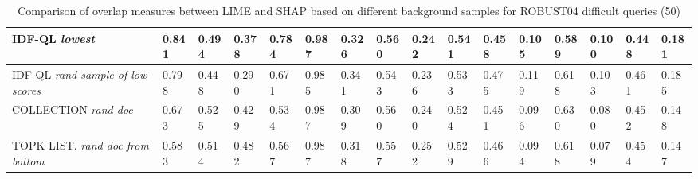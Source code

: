 \begin{table}
{\begin{tabular}{ |m{6em}|m{2em}|m{2em}|m{2em}|m{2em}|m{2.8em}||m{2em}|m{2em}|m{2em}|m{2em}|m{2.8em}||m{2em}|m{2em}|m{2em}|m{2em}|m{2.8em}|| }
 IDF-QL \newline \textit{lowest} & 0.841 & 0.494 & 0.378 & 0.784 & 0.987 & 0.326 & 0.560 & 0.242 & 0.541 & 0.458 & 0.105 & 0.589 & 0.100 & 0.448 & 0.181\\ 
 \hline
 
 IDF-QL \newline \textit{rand sample of low scores} & 0.798 & 0.448 & 0.290 & 0.671 & 0.985 & 0.341 & 0.543 & 0.236 & 0.533 & 0.475 & 0.119 & 0.618 & 0.103 & 0.461 & 0.185\\ 
 \hline
 
 COLLECTION \newline \textit{rand doc} & 0.673 & 0.525 & 0.429 & 0.534 & 0.987 & 0.309 & 0.560 & 0.240 & 0.524 & 0.451 & 0.096 & 0.630 & 0.080 & 0.452 & 0.148\\ 
 \hline
 
 TOPK LIST. \newline \textit{rand doc from bottom} & 0.583 & 0.514 & 0.482 & 0.567 & 0.987 & 0.318 & 0.557 & 0.252 & 0.529 & 0.466 & 0.094 & 0.618 & 0.079 & 0.454 & 0.147\\ 
 \hline
\end{tabular}}
\caption{Comparison of overlap measures between LIME and SHAP based on different background samples for ROBUST04 difficult queries (50)}
\label{table_diff_all_terms}
\end{table}

